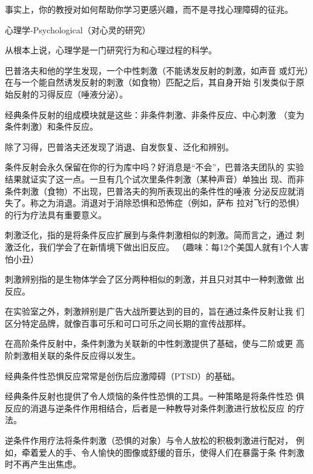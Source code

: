 \documentclass[12pt,a4paper]{article}
\begin{document}

事实上，你的教授对如何帮助你学习更感兴趣，而不是寻找心理障碍的征兆。

心理学-Psychological（对心灵的研究）

从根本上说，心理学是一门研究行为和心理过程的科学。




















巴普洛夫和他的学生发现，一个中性刺激（不能诱发反射的刺激，如声音
或灯光）在与一个能自然诱发反射的刺激（如食物）匹配之后，其自身开始
引发类似于原始反射的习得反应（唾液分泌）。

经典条件反射的组成模块就是这些：非条件刺激、非条件反应、中心刺激
（变为条件刺激）和条件反应。

除了习得，巴普洛夫还发现了消退、自发恢复、泛化和辨别。

条件反射会永久保留在你的行为库中吗？好消息是“不会”，巴普洛夫团队的
实验结果就证实了这一点。一旦有几个试次里条件刺激（某种声音）单独出
现、而非条件刺激（食物）不出现，巴普洛夫的狗所表现出的条件性的唾液
分泌反应就消失了。称之为消退。消退对于消除恐惧和恐怖症（例如，萨布
拉对飞行的恐惧）的行为疗法具有重要意义。

刺激泛化，指的是将条件反应扩展到与条件刺激相似的刺激。简而言之，通过
刺激泛化，我们学会了在新情境下做出旧反应。
（趣味：每12个美国人就有1个人害怕小丑）

刺激辨别指的是生物体学会了区分两种相似的刺激，并且只对其中一种刺激做
出反应。

在实验室之外，刺激辨别是广告大战所要达到的目的，旨在通过条件反射让我
们区分特定品牌，就像百事可乐和可口可乐之间长期的宣传战那样。

在高阶条件反射中，条件刺激为关联新的中性刺激提供了基础，使与二阶或更
高阶刺激相关联的条件反应得以发生。

经典条件性恐惧反应常常是创伤后应激障碍（PTSD）的基础。

经典条件反射也提供了令人烦恼的条件性恐惧的工具。一种策略是将条件性恐
俱反应的消退与逆条件作用相结合，后者是一种教导对条件刺激进行放松反应
的疗法。

逆条件作用疗法将条件刺激（恐惧的对象）与令人放松的积极刺激进行配对，
例如，牵着爱人的手、令人愉快的图像或舒缓的音乐，使得人们在暴露于条
件刺激时不再产生出焦虑。
\end{document}
